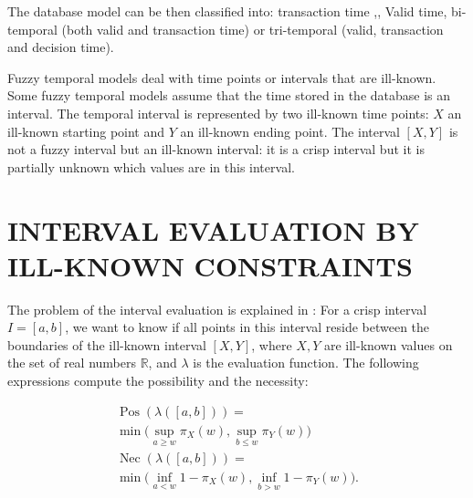\documentclass[twoside,twocolumn,a4paper]{article}
\newcommand{\Pos}{\operatorname{Pos}}
\newcommand{\Nec}{\operatorname{Nec}}
\begin{document}
	 The  database model can be then classified into: transaction time \cite{Ston87},\cite{Jensen:1991:IIM:627283.627484}, Valid time, bi-temporal \cite{Snodgrass:1984:TQL:588011.588041}(both valid and transaction time) or tri-temporal \cite{Nascimento95decisiontime} (valid, transaction and decision time).

Fuzzy temporal models \cite{4481150} deal with time points \cite{Dubois89} or intervals \cite{Garrido2009} that are ill-known. Some fuzzy temporal models assume that the time stored in the database is an interval. The temporal interval is represented by two ill-known time points: $X$  an ill-known starting point and $Y$ an ill-known ending point. The interval $\left[X,Y\right]$ is not a fuzzy interval but an ill-known interval: it is a crisp interval but it is partially unknown which values are in this interval.




\section{\label{sec:interval-eval}INTERVAL EVALUATION BY ILL-KNOWN CONSTRAINTS}
The problem of the interval evaluation is explained in \cite{Pon11}: For a crisp interval $I = \left[ a, b \right]$, we want to know if all points in this interval reside between the boundaries of the ill-known interval $\left[ X , Y \right]$, where $X,Y$ are ill-known values on the set of real numbers $\mathbb{R}$, and $\lambda$ is the evaluation function. The following expressions compute the possibility and the necessity: 

\begin{eqnarray}
\label{eq:interval-pos}
\Pos\left(\lambda([a,b])\right)=\\
\nonumber
\min\bigg(\sup_{a\geq w}\pi_{X}(w),\sup_{b\leq w}\pi_{Y}(w)\bigg)\\
\label{eq:interval-nec}
\Nec\left(\lambda([a,b])\right)=\\
\nonumber
\min\bigg(\inf_{a<w}1-\pi_{X}(w),\inf_{b>w}1-\pi_{Y}(w)\bigg).
\end{eqnarray}
\end{document}
